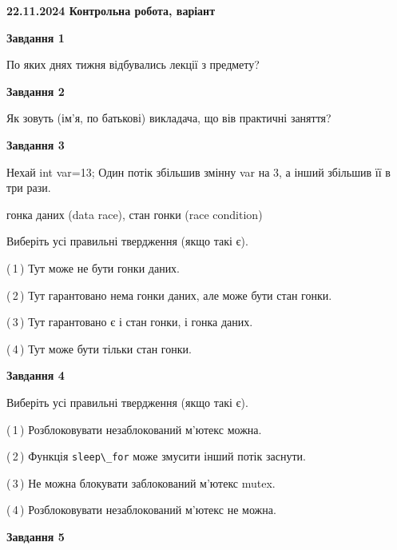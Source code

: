 \documentclass[12pt, ukrainian]{article}
\def\code#1{\Verb!#1!}
\begin{document}
\begin {large}

\textbf{22.11.2024 Контрольна робота, варіант  }\par


{

\begin{center}
\textbf{Завдання 1}
\end{center}

По яких днях тижня відбувались лекції з предмету?


\begin{center}
\textbf{Завдання 2}
\end{center}

Як зовуть (ім'я, по батькові) викладача, що вів практичні заняття?


\begin{center}
\textbf{Завдання 3}
\end{center}

Нехай int var=13; Один потік збільшив змінну var на 3, а інший збільшив її в три рази.

гонка даних (data race), стан гонки (race condition)

Виберіть усі правильні твердження (якщо такі є).\par
\vspace{2mm}
(\,1\,) Тут може не бути гонки даних.%

(\,2\,) Тут гарантовано нема гонки даних, але може бути стан гонки.%

(\,3\,) Тут гарантовано є і стан гонки, і гонка даних.%

(\,4\,) Тут може бути тільки стан гонки.%


\begin{center}
\textbf{Завдання 4}
\end{center}

Виберіть усі правильні твердження (якщо такі є).\par
\vspace{2mm}

(\,1\,) Розблоковувати незаблокований м’ютекс можна.%

(\,2\,) Функція \code{sleep\_for} може змусити інший потік заснути.%

(\,3\,) Не можна блокувати заблокований м’ютекс mutex.%

(\,4\,) Розблоковувати незаблокований м’ютекс не можна.%


\begin{center}
\textbf{Завдання 5}
\end{center}

}
\end{large}
\end{document}
